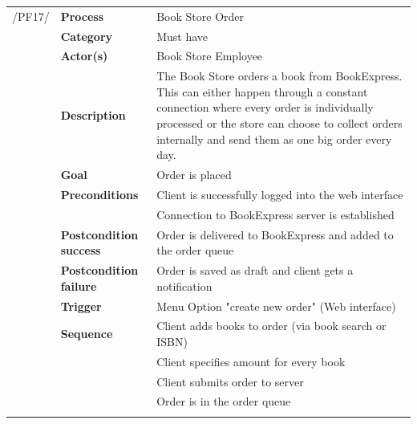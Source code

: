 \documentclass[11pt,a4paper,oneside,svgnames]{report}
\begin{document}
\noindent
\begin{tabular}{p{1.5cm}p{3cm}p{8cm}}
/PF17/	& \textbf{Process} & Book Store Order\\ 
		& \textbf{Category} & Must have\\
		& \textbf{Actor(s)} & Book Store Employee\\ 
		& \textbf{Description}	 & The Book Store orders a book from BookExpress.
This can either happen through a constant connection where every order is individually processed or the store can choose to collect orders internally and send them
as one big order every day.\\ 
		& \textbf{Goal} & Order is placed\\
		& \textbf{Preconditions} & Client is successfully logged into the web interface\\
		& & Connection to BookExpress server is established\\
		& \textbf{Postcondition success} & Order is delivered to BookExpress  and added to the order queue\\
		& \textbf{Postcondition failure} & Order is saved as draft and client gets a notification\\
		& \textbf{Trigger} & Menu Option "create new order" (Web interface)\\
		& \textbf{Sequence} & Client adds books to order (via book search or ISBN)\\
		& & Client specifies amount for every book\\
		& & Client submits order to server\\
		& & Order is in the order queue\\
\hfill \\
\end{tabular}
\end{document}
